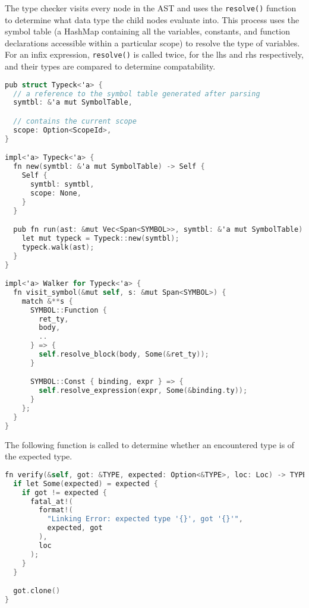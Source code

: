 The type checker visits every node in the AST and uses the \texttt{resolve()} function to determine what data type the child nodes evaluate into. This process uses the symbol table (a HashMap containing all the variables, constants, and function declarations accessible within a particular scope) to resolve the type of variables. For an infix expression, \texttt{resolve()} is called twice, for the lhs and rhs respectively, and their types are compared to determine compatability.  

\begin{lstlisting}[language=C]
pub struct Typeck<'a> {
  // a reference to the symbol table generated after parsing
  symtbl: &'a mut SymbolTable,

  // contains the current scope 
  scope: Option<ScopeId>,
}

impl<'a> Typeck<'a> {
  fn new(symtbl: &'a mut SymbolTable) -> Self {
    Self {
      symtbl: symtbl,
      scope: None,
    }
  }

  pub fn run(ast: &mut Vec<Span<SYMBOL>>, symtbl: &'a mut SymbolTable) {
    let mut typeck = Typeck::new(symtbl);
    typeck.walk(ast);
  } 
}

impl<'a> Walker for Typeck<'a> {
  fn visit_symbol(&mut self, s: &mut Span<SYMBOL>) {
    match &**s {
      SYMBOL::Function {
        ret_ty,
        body,
        ..
      } => {
        self.resolve_block(body, Some(&ret_ty));
      }

      SYMBOL::Const { binding, expr } => {
        self.resolve_expression(expr, Some(&binding.ty));
      }
    };
  }
}
\end{lstlisting}

The following function is called to determine whether an encountered type is of the expected type.

\begin{lstlisting}[language=C]
fn verify(&self, got: &TYPE, expected: Option<&TYPE>, loc: Loc) -> TYPE {
  if let Some(expected) = expected {
    if got != expected {
      fatal_at!(
        format!(
          "Linking Error: expected type '{}', got '{}'", 
          expected, got
        ),
        loc
      );
    }
  }

  got.clone()
} 
\end{lstlisting}

